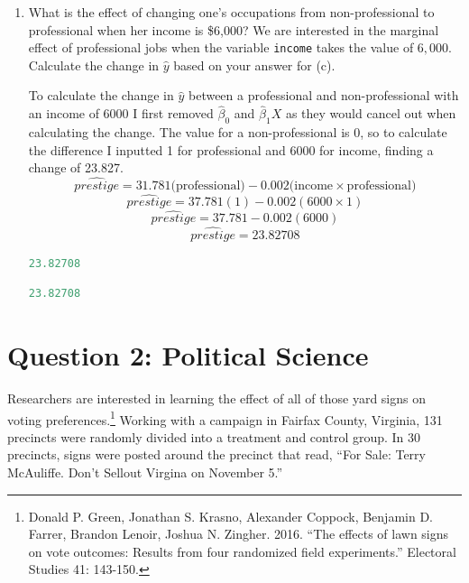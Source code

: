 \documentclass[12pt,letterpaper]{article}
\begin{document}
\begin{enumerate}
	\item [(g)]
	What is the effect of changing one's occupations from non-professional to professional when her income is \$6,000? We are interested in the marginal effect of professional jobs when the variable \texttt{income} takes the value of $6,000$. Calculate the change in $\hat{y}$ based on your answer for (c).
	
	\noindent To calculate the change in $\hat{y}$ between a professional and non-professional with an income of 6000 I first removed $\hat{\beta}_0$ and $\hat{\beta}_1  X$ as they would cancel out when calculating the change. The value for a non-professional is 0, so to calculate the difference I inputted 1 for professional and 6000 for income, finding a change of 23.827.  \\
	\newpage
	\begin{equation}
		\widehat{prestige} = 31.781\text{(professional)} - 0.002\text{(income}\times\text{professional)}
	\end{equation}
	\begin{equation}
		\widehat{prestige} = 37.781{(1)} - 0.002{(6000\times1)}
	\end{equation}
	\begin{equation}
		\widehat{prestige} = 37.781 - 0.002{(6000)}
	\end{equation}
	\begin{equation}
		\widehat{prestige} = 23.82708
	\end{equation}
	
	\begin{lstlisting}[language=R]
	23.82708	\end{lstlisting}
	
	\begin{lstlisting}[language=R]
	23.82708	\end{lstlisting}
	
	
\end{enumerate}


\section*{Question 2: Political Science}
\vspace{.25cm}
\noindent 	Researchers are interested in learning the effect of all of those yard signs on voting preferences.\footnote{Donald P. Green, Jonathan	S. Krasno, Alexander Coppock, Benjamin D. Farrer,	Brandon Lenoir, Joshua N. Zingher. 2016. ``The effects of lawn signs on vote outcomes: Results from four randomized field experiments.'' Electoral Studies 41: 143-150. } Working with a campaign in Fairfax County, Virginia, 131 precincts were randomly divided into a treatment and control group. In 30 precincts, signs were posted around the precinct that read, ``For Sale: Terry McAuliffe. Don't Sellout Virgina on November 5.'' \\
\end{document}
